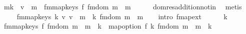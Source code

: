 \begin{isabellebody}
\ {\isachardoublequoteopen}mk\ {\isachardollar}{\kern0pt}{\isachardollar}{\kern0pt}{\isacharcolon}{\kern0pt}{\isacharequal}{\kern0pt}\ v{\isacharparenright}{\kern0pt}\ {\isasyminter}\isactrlsub {\isacharplus}{\kern0pt}\ m\ {\isacharequal}{\kern0pt}\ fmmap{\isacharunderscore}{\kern0pt}keys\ {\isacharquery}{\kern0pt}f\ {\isacharparenleft}{\kern0pt}fmdom{\isacharprime}{\kern0pt}\ m\ {\isasymlhd}\ m\isanewline
\ \ \ \ \isamarkupfalse%
\ dom{\isacharunderscore}{\kern0pt}res{\isacharunderscore}{\kern0pt}addition{\isacharunderscore}{\kern0pt}not{\isacharunderscore}{\kern0pt}in\ \isamarkupfalse%
\ metis\isanewline
\ \ \isamarkupfalse%
\ \isamarkupfalse%
\ {\isachardoublequoteopen}{\isasymdots}\ {\isacharequal}{\kern0pt}\ fmmap{\isacharunderscore}{\kern0pt}keys\ {\isacharparenleft}{\kern0pt}{\isasymlambda}k{\isacharprime}{\kern0pt}\ v{\isacharprime}{\kern0pt}{\isachardot}{\kern0pt}\ v{\isacharprime}{\kern0pt}\ {\isacharplus}{\kern0pt}\ m\ {\isachardollar}{\kern0pt}{\isachardollar}{\kern0pt}{\isacharbang}{\kern0pt}\ k{\isacharprime}{\kern0pt}{\isacharparenright}{\kern0pt}\ {\isacharparenleft}{\kern0pt}fmdom{\isacharprime}{\kern0pt}\ m\ {\isasymlhd}\ m\isanewline
\ \ \isamarkupfalse%
\ {\isacharparenleft}{\kern0pt}intro\ fmap{\isacharunderscore}{\kern0pt}ext{\isacharparenright}{\kern0pt}\isanewline
\ \ \ \ \isamarkupfalse%
\ k{\isacharprime}{\kern0pt}\isanewline
\ \ \ \ \isamarkupfalse%
\ {\isachardoublequoteopen}fmmap{\isacharunderscore}{\kern0pt}keys\ {\isacharquery}{\kern0pt}f\ {\isacharparenleft}{\kern0pt}fmdom{\isacharprime}{\kern0pt}\ m\ {\isasymlhd}\ m\ {\isachardollar}{\kern0pt}{\isachardollar}{\kern0pt}\ k{\isacharprime}{\kern0pt}\ {\isacharequal}{\kern0pt}\ map{\isacharunderscore}{\kern0pt}option\ {\isacharparenleft}{\kern0pt}{\isacharquery}{\kern0pt}f\ k{\isacharprime}{\kern0pt}{\isacharparenright}{\kern0pt}\ {\isacharparenleft}{\kern0pt}{\isacharparenleft}{\kern0pt}fmdom{\isacharprime}{\kern0pt}\ m\ {\isasymlhd}\ m\ {\isachardollar}{\kern0pt}{\isachardollar}{\kern0pt}\ k{\isacharprime}{\kern0pt}{\isacharparenright}{\kern0pt}{\isachardoublequoteclose}\isanewline

\end{isabellebody}
